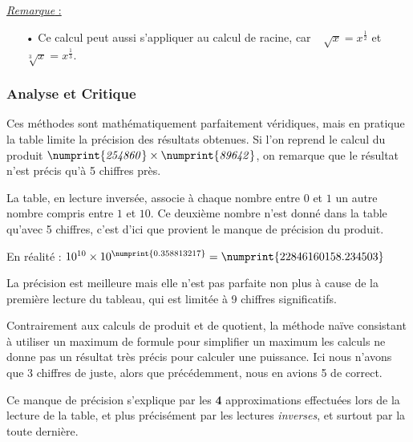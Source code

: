 \documentclass[a4paper]{article}
\begin{document}
{\begin{large}
\begin{tabular}{l|l}
\end{tabular}
\end{large}
}

\vspace{0.3 cm}

{\noindent\underline{\textit{Remarque} :}}

\begin{itemize}

	\item[•] Ce calcul peut aussi s'appliquer au calcul de racine, car ~{\Large $\sqrt[]{x} = x^{\frac{1}{2}}$} et {\Large $\sqrt[3]{x} = x^{\frac{1}{3}}$}.
	
\end{itemize}

\vfill

\subsubsection*{Analyse et Critique}

Ces méthodes sont mathématiquement parfaitement véridiques, mais en pratique la table limite la précision des résultats obtenues. Si l'on reprend le calcul du produit $\mathit{\numprint{254860} \times \numprint{89642}}$, on remarque que le résultat n'est précis qu'à 5 chiffres près.

La table, en lecture inversée, associe à chaque nombre entre $0$ et $1$ un autre nombre compris entre $1$ et $10$. Ce deuxième nombre n'est donné dans la table qu'avec 5 chiffres, c'est d'ici que provient le manque de précision du produit.

En réalité : $10 ^{ 10 } \times 10^{\numprint{0.358813217}} = \numprint{22846160158.234503}$

La précision est meilleure mais elle n'est pas parfaite non plus à cause de la première lecture du tableau, qui est limitée à 9 chiffres significatifs.\\


\par Contrairement aux calculs de produit et de quotient, la méthode naïve consistant à utiliser un maximum de formule pour simplifier un maximum les calculs ne donne pas un résultat très précis pour calculer une puissance. Ici nous n'avons que 3 chiffres de juste, alors que précédemment, nous en avions 5 de correct.

Ce manque de précision s'explique par les \textbf{4} approximations effectuées lors de la lecture de la table, et plus précisément par les lectures \textit{inverses}, et surtout par la toute dernière.\\
\end{document}
